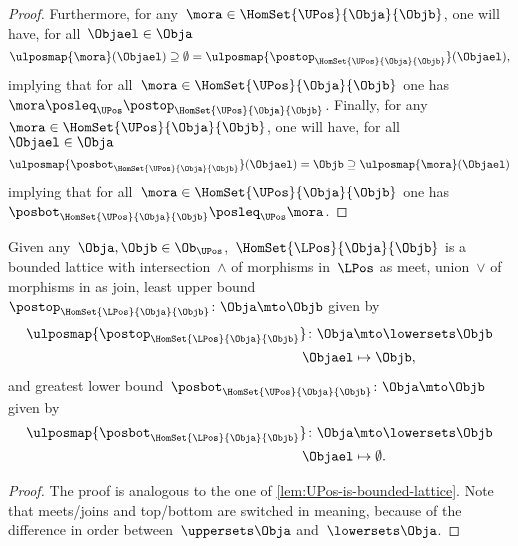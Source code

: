 \begin{proof}
Furthermore, for any~$\mora \in \HomSet{\UPos}{\Obja}{\Objb}$, one will have, for all~$\Objael \in \Obja$
\begin{equation*}
\ulposmap{\mora}(\Objael) \supseteq \emptyset=\ulposmap{\postop_{\HomSet{\UPos}{\Obja}{\Objb}}}(\Objael),
\end{equation*}
implying that for all~$\mora \in \HomSet{\UPos}{\Obja}{\Objb}$ one has~$\mora \posleq_\UPos \postop_{\HomSet{\UPos}{\Obja}{\Objb}}$.
Finally, for any~$\mora \in \HomSet{\UPos}{\Obja}{\Objb}$, one will have, for all~$\Objael \in \Obja$
\begin{equation*}
\ulposmap{\posbot_{\HomSet{\UPos}{\Obja}{\Objb}}}(\Objael)=\Objb \supseteq \ulposmap{\mora}(\Objael)
\end{equation*}
implying that for all~$\mora \in \HomSet{\UPos}{\Obja}{\Objb}$ one has~$\posbot_{\HomSet{\UPos}{\Obja}{\Objb}}\posleq_\UPos \mora$.
\end{proof}

\begin{lemma}
\label{lem:LPos-is-bounded-lattice}
Given any~$\Obja,\Objb\in \Ob_\UPos$,~$\HomSet{\LPos}{\Obja}{\Objb}$ is a bounded lattice with intersection~$\wedge$ of morphisms in~$\LPos$ as meet, union~$\vee$ of morphisms in \LPos as join, least upper bound~$\postop_{\HomSet{\LPos}{\Obja}{\Objb}}\colon \Obja \mto \Objb$ given by
\begin{equation*}
\begin{aligned}
\ulposmap{\postop_{\HomSet{\LPos}{\Obja}{\Objb}}}\colon \Obja &\mto \lowersets \Objb\\
\Objael &\mapsto \Objb,
\end{aligned}
\end{equation*}
and greatest lower bound~$\posbot_{\HomSet{\UPos}{\Obja}{\Objb}}\colon \Obja \mto \Objb$ given by
\begin{equation*}
\begin{aligned}
\ulposmap{\posbot_{\HomSet{\LPos}{\Obja}{\Objb}}}\colon \Obja &\mto \lowersets \Objb\\
\Objael &\mapsto \emptyset.
\end{aligned}
\end{equation*}
\end{lemma}
\begin{proof}
The proof is analogous to the one of \cref{lem:UPos-is-bounded-lattice}.
Note that meets/joins and top/bottom are switched in meaning, because of the difference in order between~$\uppersets \Obja$ and~$\lowersets \Obja$.
\end{proof}


